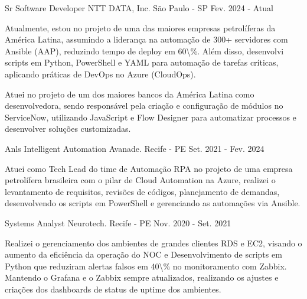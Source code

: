 

\begin{cventries}

  \cventry
    {Sr Software Developer} %
    {NTT DATA, Inc.} %
    {São Paulo - SP} %
    {Fev. 2024 - Atual} %
    {
      \begin{cvitems} %
        \item {Atualmente, estou no projeto de uma das maiores empresas petrolíferas da América Latina, assumindo a liderança na automação de 300+ servidores com Ansible (AAP), reduzindo tempo de deploy em 60\textbackslash{}\%. Além disso, desenvolvi scripts em Python, PowerShell e YAML para automação de tarefas críticas, aplicando práticas de DevOps no Azure (CloudOps).}
        \item {Atuei no projeto de um dos maiores bancos da América Latina como desenvolvedora, sendo responsável pela criação e configuração de módulos no ServiceNow, utilizando JavaScript e Flow Designer para automatizar processos e desenvolver soluções customizadas.}
      \end{cvitems}
    }

  \cventry
    {Anls Intelligent Automation} %
    {Avanade.} %
    {Recife - PE} %
    {Set. 2021 - Fev. 2024} %
    {
      \begin{cvitems} %
        \item {Atuei como Tech Lead do time de Automação RPA no projeto de uma empresa petrolífera brasileira com o pilar de Cloud Automation na Azure, realizei o levantamento de requisitos, revisões de códigos, planejamento de demandas, desenvolvendo os scripts em PowerShell e gerenciando as automações via Ansible. }
      \end{cvitems}
    }

  \cventry
    {Systems Analyst} %
    {Neurotech.} %
    {Recife - PE} %
    {Nov. 2020 - Set. 2021} %
    {
      \begin{cvitems} %
        \item {Realizei o gerenciamento dos ambientes de grandes clientes RDS e EC2, visando o aumento da eficiência da operação do NOC e Desenvolvimento de scripts em Python que reduziram alertas falsos em 40\textbackslash{}\% no monitoramento com Zabbix. Mantendo o Grafana e o Zabbix sempre atualizados, realizando os ajustes e criações dos dashboards de status de uptime dos ambientes.}
      \end{cvitems}
    }

\end{cventries}
